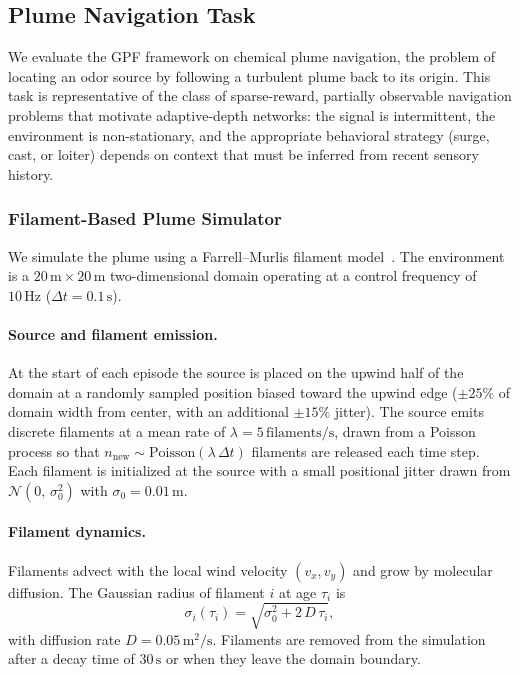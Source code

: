
\subsection{Plume Navigation Task}

We evaluate the GPF framework on chemical plume navigation, the problem of
locating an odor source by following a turbulent plume back to its origin.
This task is representative of the class of sparse-reward, partially
observable navigation problems that motivate adaptive-depth networks: the
signal is intermittent, the environment is non-stationary, and the
appropriate behavioral strategy (surge, cast, or loiter) depends on
context that must be inferred from recent sensory history.

\subsubsection{Filament-Based Plume Simulator}

We simulate the plume using a Farrell--Murlis filament
model~\cite{farrell2002filament}.  The environment is a
$20\,\text{m} \times 20\,\text{m}$ two-dimensional domain operating at a
control frequency of $10\,\text{Hz}$ ($\Delta t = 0.1\,\text{s}$).

\paragraph{Source and filament emission.}
At the start of each episode the source is placed on the upwind half of the
domain at a randomly sampled position biased toward the upwind edge
($\pm 25\%$ of domain width from center, with an additional $\pm 15\%$
jitter).  The source emits discrete filaments at a mean rate of
$\lambda = 5\,\text{filaments/s}$, drawn from a Poisson process so that
$n_{\text{new}} \sim \text{Poisson}(\lambda\,\Delta t)$ filaments are
released each time step.  Each filament is initialized at the source with a
small positional jitter drawn from $\mathcal{N}(0,\,\sigma_0^2)$ with
$\sigma_0 = 0.01\,\text{m}$.

\paragraph{Filament dynamics.}
Filaments advect with the local wind velocity $(v_x, v_y)$ and grow by
molecular diffusion.  The Gaussian radius of filament $i$ at age
$\tau_i$ is
\begin{equation}
  \sigma_i(\tau_i) = \sqrt{\sigma_0^2 + 2\,D\,\tau_i},
  \label{eq:filament_diffusion}
\end{equation}
with diffusion rate $D = 0.05\,\text{m}^2/\text{s}$.  Filaments are
removed from the simulation after a decay time of $30\,\text{s}$ or when
they leave the domain boundary.

